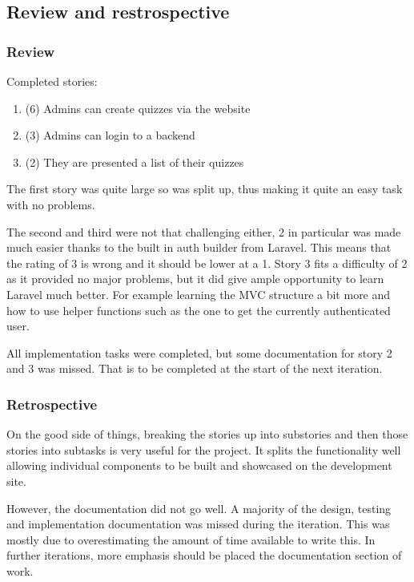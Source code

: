 \subsection{Review and restrospective}
\subsubsection{Review}
Completed stories:
\begin{enumerate}
	\item (6) Admins can create quizzes via the website
	\item (3) Admins can login to a backend
	\item (2) They are presented a list of their quizzes
\end{enumerate}
The first story was quite large so was split up, thus making it quite an easy task with no problems.

The second and third were not that challenging either, 2 in particular was made much easier thanks to the built in auth builder from Laravel. This means that the rating of 3 is wrong and it should be lower at a 1. Story 3 fits a difficulty of 2 as it provided no major problems, but it did give ample opportunity to learn Laravel much better. For example learning the MVC structure a bit more and how to use helper functions such as the one to get the currently authenticated user.

All implementation tasks were completed, but some documentation for story 2 and 3 was missed. That is to be completed at the start of the next iteration.

\subsubsection{Retrospective}
On the good side of things, breaking the stories up into substories and then those stories into subtasks is very useful for the project. It splits the functionality well allowing individual components to be built and showcased on the development site.

However, the documentation did not go well. A majority of the design, testing and implementation documentation was missed during the iteration. This was mostly due to overestimating the amount of time available to write this. In further iterations, more emphasis should be placed the documentation section of work.
\newpage
